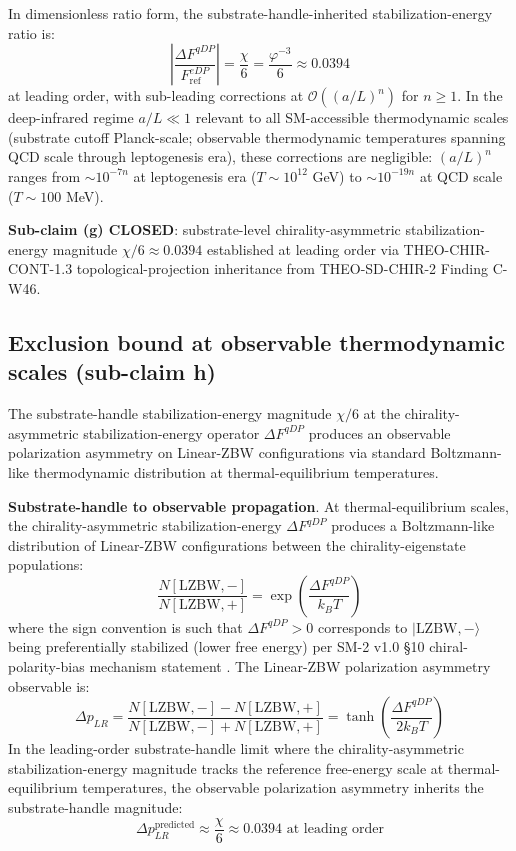 \documentclass[11pt,letterpaper]{article}
\newcommand{\DeltapLR}{\Delta p_{LR}}
\newcommand{\DeltaFqDP}{\Delta F^{qDP}}
\newcommand{\FeDPref}{F^{eDP}_{\text{ref}}}
\begin{document}
In dimensionless ratio form, the substrate-handle-inherited stabilization-energy ratio is:
\begin{equation}
\left|\frac{\DeltaFqDP}{\FeDPref}\right| = \frac{\chi}{6} = \frac{\varphi^{-3}}{6} \approx 0.0394
\label{eq:stabilization_energy_ratio}
\end{equation}
at leading order, with sub-leading corrections at $\mathcal{O}((a/L)^n)$ for $n \geq 1$. In the deep-infrared regime $a/L \ll 1$ relevant to all SM-accessible thermodynamic scales (substrate cutoff Planck-scale; observable thermodynamic temperatures spanning QCD scale through leptogenesis era), these corrections are negligible: $(a/L)^n$ ranges from $\sim 10^{-7n}$ at leptogenesis era ($T \sim 10^{12}$ GeV) to $\sim 10^{-19n}$ at QCD scale ($T \sim 100$ MeV).

\textbf{Sub-claim (g) CLOSED}: substrate-level chirality-asymmetric stabilization-energy magnitude $\chi/6 \approx 0.0394$ established at leading order via THEO-CHIR-CONT-1.3 topological-projection inheritance from THEO-SD-CHIR-2 Finding C-W46.

\subsection{Exclusion bound at observable thermodynamic scales (sub-claim h)}
\label{sec:exclusion_bound}

The substrate-handle stabilization-energy magnitude $\chi/6$ at the chirality-asymmetric stabilization-energy operator $\DeltaFqDP$ produces an observable polarization asymmetry on Linear-ZBW configurations via standard Boltzmann-like thermodynamic distribution at thermal-equilibrium temperatures.

\textbf{Substrate-handle to observable propagation}. At thermal-equilibrium scales, the chirality-asymmetric stabilization-energy $\DeltaFqDP$ produces a Boltzmann-like distribution of Linear-ZBW configurations between the chirality-eigenstate populations:
\begin{equation}
\frac{N[\text{LZBW},-]}{N[\text{LZBW},+]} = \exp\left(\frac{\DeltaFqDP}{k_B T}\right)
\label{eq:boltzmann_ratio}
\end{equation}
where the sign convention is such that $\DeltaFqDP > 0$ corresponds to $|\text{LZBW},-\rangle$ being preferentially stabilized (lower free energy) per SM-2 v1.0 §10 chiral-polarity-bias mechanism statement \cite{SM2v1}. The Linear-ZBW polarization asymmetry observable is:
\begin{equation}
\DeltapLR = \frac{N[\text{LZBW},-] - N[\text{LZBW},+]}{N[\text{LZBW},-] + N[\text{LZBW},+]} = \tanh\left(\frac{\DeltaFqDP}{2 k_B T}\right)
\label{eq:Delta_p_LR}
\end{equation}
In the leading-order substrate-handle limit where the chirality-asymmetric stabilization-energy magnitude tracks the reference free-energy scale at thermal-equilibrium temperatures, the observable polarization asymmetry inherits the substrate-handle magnitude:
\begin{equation}
\boxed{\DeltapLR^{\text{predicted}} \approx \frac{\chi}{6} \approx 0.0394 \text{ at leading order}}
\label{eq:Delta_p_LR_prediction}
\end{equation}
\end{document}
